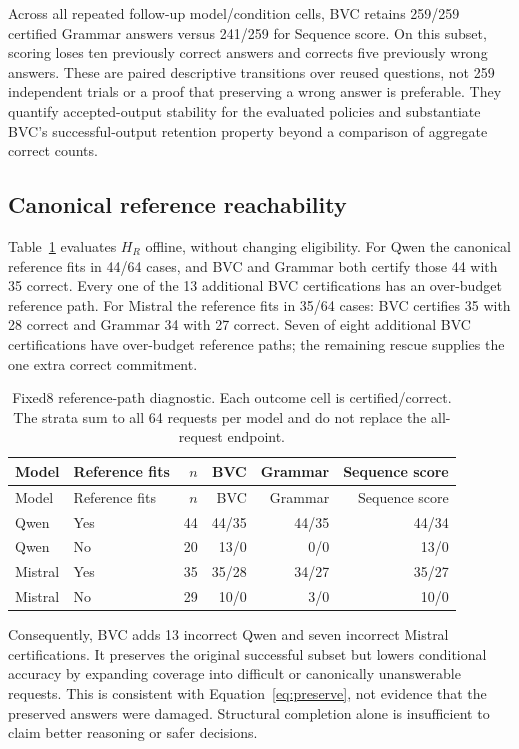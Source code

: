 \documentclass[12pt,a4paper]{article}
\begin{document}
Across all repeated follow-up model/condition cells, BVC retains 259/259 certified Grammar answers versus 241/259 for Sequence score. On this subset, scoring loses ten previously correct answers and corrects five previously wrong answers. These are paired descriptive transitions over reused questions, not 259 independent trials or a proof that preserving a wrong answer is preferable. They quantify accepted-output stability for the evaluated policies and substantiate BVC's successful-output retention property beyond a comparison of aggregate correct counts.

\subsection{Canonical reference reachability}\label{sec:reachability}
Table~\ref{tab:reachability} evaluates $H_R$ offline, without changing eligibility. For Qwen the canonical reference fits in 44/64 cases, and BVC and Grammar both certify those 44 with 35 correct. Every one of the 13 additional BVC certifications has an over-budget reference path. For Mistral the reference fits in 35/64 cases: BVC certifies 35 with 28 correct and Grammar 34 with 27 correct. Seven of eight additional BVC certifications have over-budget reference paths; the remaining rescue supplies the one extra correct commitment.
\begin{longtable}{@{}llrrrr@{}}
\caption{Fixed8 reference-path diagnostic. Each outcome cell is certified/correct. The strata sum to all 64 requests per model and do not replace the all-request endpoint.}\label{tab:reachability}\\
\toprule
Model & Reference fits & $n$ & BVC & Grammar & Sequence score \\
\midrule
\endfirsthead
\toprule
Model & Reference fits & $n$ & BVC & Grammar & Sequence score \\
\midrule
\endhead
Qwen & Yes & 44 & 44/35 & 44/35 & 44/34 \\
Qwen & No & 20 & 13/0 & 0/0 & 13/0 \\
Mistral & Yes & 35 & 35/28 & 34/27 & 35/27 \\
Mistral & No & 29 & 10/0 & 3/0 & 10/0 \\
\bottomrule
\end{longtable}

Consequently, BVC adds 13 incorrect Qwen and seven incorrect Mistral certifications. It preserves the original successful subset but lowers conditional accuracy by expanding coverage into difficult or canonically unanswerable requests. This is consistent with Equation~\ref{eq:preserve}, not evidence that the preserved answers were damaged. Structural completion alone is insufficient to claim better reasoning or safer decisions.
\end{document}
